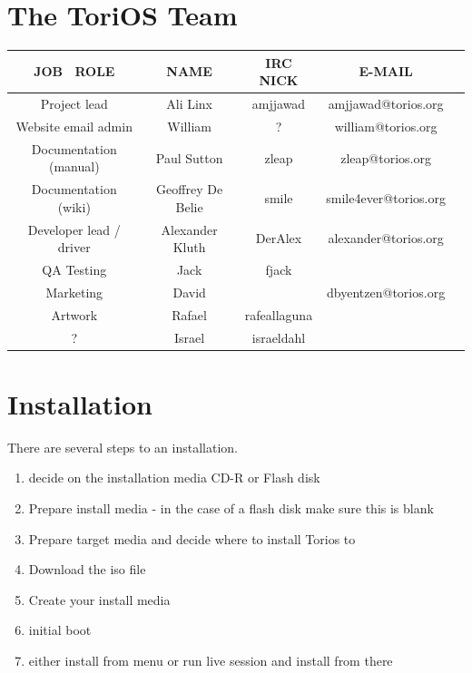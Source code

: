 \documentclass[12pt,a4paper]{book}
\begin{document}
\chapter{The ToriOS Team}

\begin{tabular}{|c|c|c|c|c|}
\hline  \textbf{JOB \ ROLE} & \textbf{NAME}  & \textbf{IRC NICK} & \textbf{E-MAIL}  \\ 
\hline  Project lead & Ali Linx  & amjjawad & amjjawad@torios.org  \\ 
\hline  Website email admin & William  & ? & william@torios.org  \\ 
\hline  Documentation (manual)  & Paul Sutton  & zleap  & zleap@torios.org \\ 
\hline  Documentation (wiki) & Geoffrey De Belie & smile  & smile4ever@torios.org  \\ 
\hline  Developer lead / driver & Alexander Kluth & DerAlex & alexander@torios.org \\ 
\hline  QA Testing & Jack  & fjack  &  \\ 
\hline  Marketing & David &  & dbyentzen@torios.org \\
\hline Artwork & Rafael & rafeallaguna & \\
\hline ? & Israel & israeldahl & \\

\hline 
\end{tabular}


\chapter{Installation}

There are several steps to an installation. \\
\begin{enumerate}
\item decide on the installation media CD-R or Flash disk
\item Prepare install media - in the case of a flash disk make sure this is blank
\item Prepare target media and decide where to install Torios to
\item Download the iso file
\item Create your install media
\item initial boot
\item either install from menu or run live session and install from there
\end{enumerate}
\end{document}

